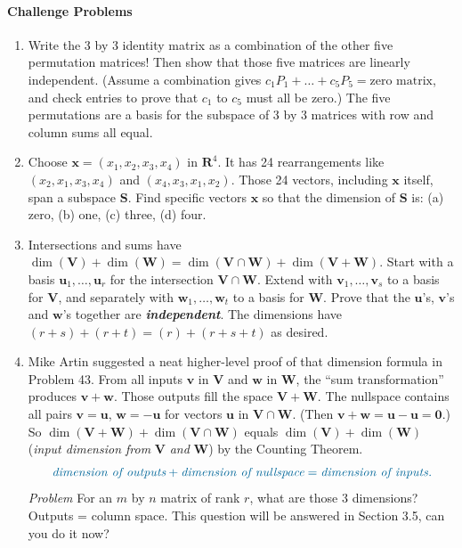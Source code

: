 \documentclass[14pt, a4paper]{article}
\begin{document}
\paragraph{Challenge Problems}
\begin{enumerate}[resume]
    \item Write the 3 by 3 identity matrix as a combination of the other five permutation matrices! Then show that those five matrices are linearly independent. (Assume a combination gives $c_1 P_1 + \dots + c_5 P_5 = \text{zero matrix}$, and check entries to prove that $c_1$ to $c_5$ must all be zero.) The five permutations are a basis for the subspace of 3 by 3 matrices with row and column sums all equal.

    \item Choose $\boldsymbol{x} = (x_1, x_2, x_3, x_4)$ in $\mathbf{R}^4$. It has 24 rearrangements like $(x_2, x_1, x_3, x_4)$ and $(x_4, x_3, x_1, x_2)$. Those 24 vectors, including $\boldsymbol{x}$ itself, span a subspace $\mathbf{S}$. Find specific vectors $\boldsymbol{x}$ so that the dimension of $\mathbf{S}$ is: (a) zero, (b) one, (c) three, (d) four.

    \item Intersections and sums have $\dim(\mathbf{V}) + \dim(\mathbf{W}) = \dim(\mathbf{V} \cap \mathbf{W}) + \dim(\mathbf{V} + \mathbf{W})$. Start with a basis $\boldsymbol{u}_1, \dots, \boldsymbol{u}_r$ for the intersection $\mathbf{V} \cap \mathbf{W}$. Extend with $\boldsymbol{v}_1, \dots, \boldsymbol{v}_s$ to a basis for $\mathbf{V}$, and separately with $\boldsymbol{w}_1, \dots, \boldsymbol{w}_t$ to a basis for $\mathbf{W}$. Prove that the $\boldsymbol{u}$'s, $\boldsymbol{v}$'s and $\boldsymbol{w}$'s together are \textbf{\textit{independent}}. The dimensions have $(r + s) + (r + t) = (r) + (r + s + t)$ as desired.

    \item Mike Artin suggested a neat higher-level proof of that dimension formula in Problem 43. From all inputs $\boldsymbol{v}$ in $\mathbf{V}$ and $\boldsymbol{w}$ in $\mathbf{W}$, the ``sum transformation'' produces $\boldsymbol{v} + \boldsymbol{w}$. Those outputs fill the space $\mathbf{V} + \mathbf{W}$. The nullspace contains all pairs $\boldsymbol{v} = \boldsymbol{u}$, $\boldsymbol{w} = -\boldsymbol{u}$ for vectors $\boldsymbol{u}$ in $\mathbf{V} \cap \mathbf{W}$. (Then $\boldsymbol{v} + \boldsymbol{w} = \boldsymbol{u} - \boldsymbol{u} = \boldsymbol{0}$.) So $\dim(\mathbf{V} + \mathbf{W}) + \dim(\mathbf{V} \cap \mathbf{W})$ equals $\dim(\mathbf{V}) + \dim(\mathbf{W})$ (\textit{input dimension from} $\mathbf{V}$ \textit{and} $\mathbf{W}$) by the Counting Theorem.
          \[
              \color{blue!60!green} \textit{dimension of outputs} + \textit{dimension of nullspace} = \textit{dimension of inputs.}
          \]
          \textit{Problem} \quad For an $m$ by $n$ matrix of rank $r$, what are those 3 dimensions? Outputs = column space. This question will be answered in Section 3.5, can you do it now?


\end{enumerate}
\end{document}
